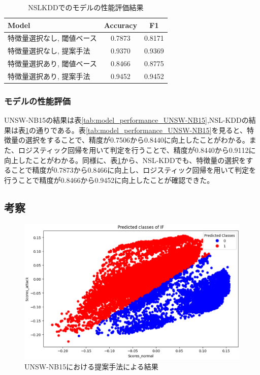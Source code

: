 \documentclass{css}
\begin{document}
\begin{table}[ht]
    \caption{NSLKDDでのモデルの性能評価結果}
    \centering
    \footnotesize
    \begin{tabular}{lcc}
        \hline\hline
        Model & Accuracy & F1 \\
        \hline
        特徴量選択なし, 閾値ベース& 0.7873 & 0.8171 \\
        特徴量選択なし, 提案手法 & 0.9370 & 0.9369 \\ 
        特徴量選択あり, 閾値ベース& 0.8466 & 0.8775 \\
        特徴量選択あり, 提案手法 & 0.9452 & 0.9452 \\
        \hline
    \end{tabular}
    \label{tab:model_performance_NSL-KDD}
\end{table}

\subsubsection{モデルの性能評価}
UNSW-NB15の結果は表\ref{tab:model_performance_UNSW-NB15},NSL-KDDの結果は表\ref{tab:model_performance_NSL-KDD}の通りである。表\ref{tab:model_performance_UNSW-NB15}を見ると、特徴量の選択をすることで、精度が0.7506から0.8440に向上したことがわかる。また、ロジスティック回帰を用いて判定を行うことで、精度が0.8440から0.9112に向上したことがわかる。同様に、表\ref{tab:model_performance_NSL-KDD}から、NSL-KDDでも、特徴量の選択をすることで精度が0.7873から0.8466に向上し、ロジスティック回帰を用いて判定を行うことで精度が0.8466から0.9452に向上したことが確認できた。

\subsection{考察}

\begin{figure}[ht]
    \centering
    \includegraphics[width=\linewidth]{pictures/eps/UNSW-NB153.eps}
    \caption{UNSW-NB15における提案手法による結果}
    \label{fig:UNSW-NB153}
\end{figure}
\end{document}
